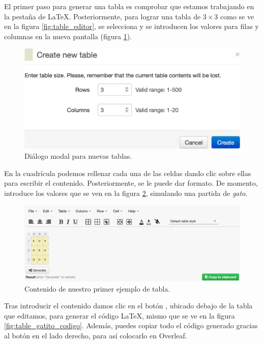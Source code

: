 El primer paso para generar una tabla es comprobar que estamos trabajando en la pestaña de \LaTeX{}. Posteriormente, para lograr una tabla de $3\times3$ como se ve en la figura \ref{fig:table_editor}, se selecciona  y se introducen los valores para filas y columnas en la nueva pantalla (figura \ref{fig:new_table}).

\begin{figure}[ht!]
	\centering
	\includegraphics[scale=0.80]{img/table_new_table_300ppi.png}
	\caption{Diálogo modal para nuevas tablas.}
	\label{fig:new_table}
\end{figure}

En la cuadrícula podemos rellenar cada una de las celdas dando clic sobre ellas para escribir el contenido. Posteriormente, se le puede dar formato. De momento, introduce los valores que se ven en la figura \ref{fig:table_gatito}, simulando una partida de \emph{gato}.

\begin{figure}[ht!]
	\centering
	\includegraphics[width=\linewidth]{img/table_gatito_300ppi.png}
	\caption{Contenido de nuestro primer ejemplo de tabla.}
	\label{fig:table_gatito}
\end{figure}

Tras introducir el contenido damos clic en el botón , ubicado debajo de la tabla que editamos, para generar el código \LaTeX{}, mismo que se ve en la figura \ref{fig:table_gatito_codigo}. Además, puedes copiar todo el código generado gracias al botón  en el lado derecho, para así colocarlo en Overleaf.

